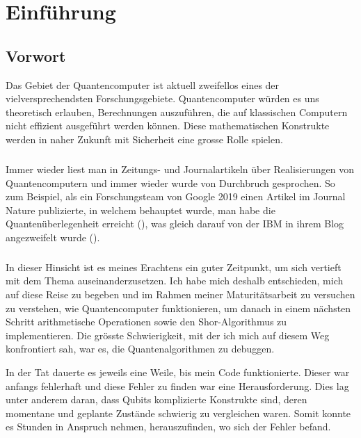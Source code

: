\chapter{Einführung}
\section{Vorwort}
Das Gebiet der Quantencomputer ist aktuell zweifellos eines der vielversprechendsten Forschungsgebiete. Quantencomputer würden es uns theoretisch erlauben, Berechnungen auszuführen, die auf klassischen Computern nicht effizient ausgeführt werden können. Diese mathematischen Konstrukte werden in naher Zukunft mit Sicherheit eine grosse Rolle spielen. 

\paragraph{}

Immer wieder liest man in Zeitungs- und Journalartikeln über Realisierungen von Quantencomputern und immer wieder wurde von Durchbruch gesprochen. So zum Beispiel, als ein Forschungsteam von Google 2019 einen Artikel im Journal \grqq Nature\grqq{} publizierte, in welchem behauptet wurde, man habe die \grqq Quantenüberlegenheit\grqq{} erreicht (\cite{GSP}), was gleich darauf von der IBM in ihrem Blog angezweifelt wurde (\cite{IBM}).

\paragraph{}

In dieser Hinsicht ist es meines Erachtens ein guter Zeitpunkt, um sich vertieft mit dem Thema auseinanderzusetzen. Ich habe mich deshalb entschieden, mich auf diese Reise zu begeben und im Rahmen meiner Maturitätsarbeit zu versuchen zu verstehen, wie Quantencomputer funktionieren, um danach in einem nächsten Schritt arithmetische Operationen sowie den Shor-Algorithmus zu implementieren. Die grösste Schwierigkeit, mit der ich mich auf diesem Weg konfrontiert sah, war es, die Quantenalgorithmen zu debuggen.

In der Tat dauerte es jeweils eine Weile, bis mein Code funktionierte. Dieser war anfangs fehlerhaft und diese Fehler zu finden war eine Herausforderung. Dies lag unter anderem daran, dass Qubits komplizierte Konstrukte sind, deren momentane und geplante Zustände schwierig zu vergleichen waren. Somit konnte es Stunden in Anspruch nehmen, herauszufinden, wo sich der Fehler befand.

